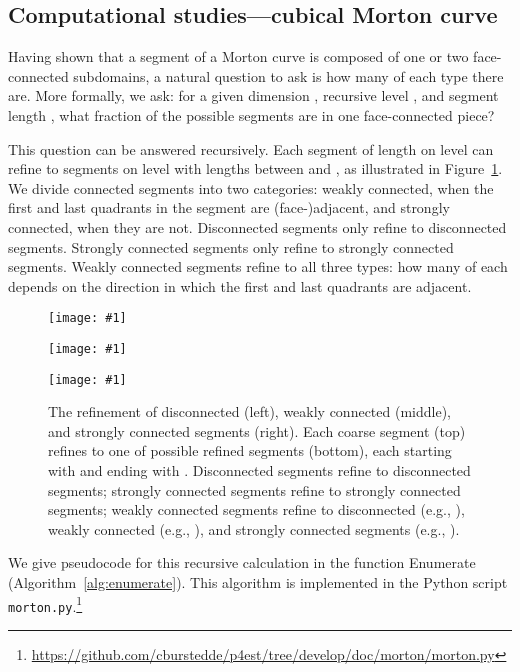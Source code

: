 \documentclass[a4paper,11pt]{article}
\newcommand{\inputtikz}[1]{\texttt{[image: \#1]}}
\newcommand{\figlab}[1]{\label{fig:#1}}
\newcommand{\figref}[1]{Figure~\ref{fig:#1}}
\newcommand{\seclab}[1]{\label{sec:#1}}
\newcommand{\algref}[1]{Algorithm~\ref{alg:#1}}
\begin{document}
\subsection{Computational studies---cubical Morton curve}
\seclab{numerical}

Having shown that a segment of a Morton curve is composed of one or two
face-connected subdomains, a natural question to ask is how many of each type
there are.  More formally, we ask: for a given dimension , recursive level
, and segment length , what fraction  of the
 possible segments are in one face-connected piece? 


This question can be answered recursively.  Each segment of length  on
level  can refine to  segments on level  with lengths between
 and , as illustrated in \figref{segmentrecurse}.  We
divide connected segments into two categories: weakly connected, when the
first and last quadrants in the segment are (face-)adjacent, and strongly connected,
when they are not.  Disconnected segments only refine to disconnected
segments.  Strongly connected segments only refine to strongly connected
segments.  Weakly connected segments refine to all three types: how many of
each depends on the direction in which the first and last quadrants are
adjacent.

\begin{figure}\centering
  \begin{minipage}{0.32\textwidth}\centering
    \inputtikz{segmentrecurse1}
  \end{minipage}
  \begin{minipage}{0.32\textwidth}\centering
    \inputtikz{segmentrecurse2}
  \end{minipage}
  \begin{minipage}{0.32\textwidth}\centering
    \inputtikz{segmentrecurse3}
  \end{minipage}
  \caption{The refinement of disconnected (left), weakly connected (middle), and
    strongly connected segments (right).  Each coarse segment (top) refines to
    one of  possible refined segments (bottom), each starting with
     and ending with .
    Disconnected segments refine to disconnected segments; strongly connected
    segments refine to strongly connected segments; weakly connected segments
    refine to disconnected (e.g., ), weakly connected
    (e.g., ), and strongly connected segments (e.g.,
    ).}\figlab{segmentrecurse}
\end{figure}We give pseudocode for this recursive calculation in the function Enumerate
(\algref{enumerate}).  This algorithm is implemented in the Python script
\texttt{morton.py}.\footnote{\url{https://github.com/cburstedde/p4est/tree/develop/doc/morton/morton.py}}
\end{document}
